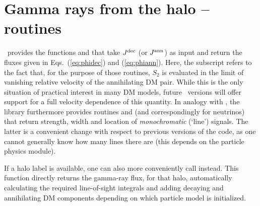 
\section{Gamma rays from the halo -- routines}

\ds\  provides the functions  and  that take $J^{\rm dec}$ 
(or $J^{\rm ann}$)  as input and return the fluxes given in  Eqs.~(\ref{eq:phidec}) and (\ref{eq:phiann}). Here, the subscript  refers to the fact that, for the
purpose of those routines, $S_2$ is evaluated
in the limit of vanishing relative velocity of the annihilating DM pair. While this is the only situation of practical 
interest in many DM models, future \ds\ versions will offer support for a full velocity dependence of this quantity.
In analogy with , the  library furthermore provides
routines  and  (and correspondingly for neutrinos) 
that return strength, width and location of {\it monochromatic} (`line') signals. The latter is a convenient
change with respect to previous versions of the code,  as one cannot generally know how many lines there
are (this depends on the particle physics module).

If a halo label is available, one can also 
more conveniently call  instead. This function  directly returns the gamma-ray flux,
for that halo, 
automatically calculating the required line-of-sight integrals and adding decaying and annihilating DM
components depending on which particle model is initialized. 
